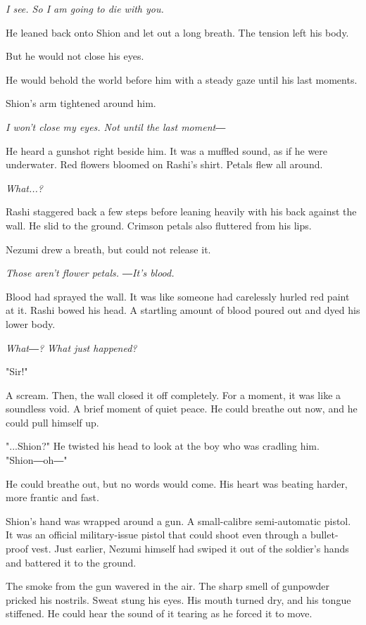 \emph{I see. So I am going to die with you.}

He leaned back onto Shion and let out a long breath. The tension left
his body.

But he would not close his eyes.

He would behold the world before him with a steady gaze until his last
moments.

Shion's arm tightened around him.

\emph{I won't close my eyes. Not until the last moment―}

He heard a gunshot right beside him. It was a muffled sound, as if he
were underwater. Red flowers bloomed on Rashi's shirt. Petals flew all
around.

\emph{What...?}

Rashi staggered back a few steps before leaning heavily with his back
against the wall. He slid to the ground. Crimson petals also fluttered
from his lips.

Nezumi drew a breath, but could not release it.

\emph{Those aren't flower petals. ―It's blood.}

Blood had sprayed the wall. It was like someone had carelessly hurled
red paint at it. Rashi bowed his head. A startling amount of blood
poured out and dyed his lower body.

\emph{What―? What just happened?}

"Sir!"

A scream. Then, the wall closed it off completely. For a moment, it was
like a soundless void. A brief moment of quiet peace. He could breathe
out now, and he could pull himself up.

"...Shion?" He twisted his head to look at the boy who was cradling him.
"Shion―oh―"

He could breathe out, but no words would come. His heart was beating
harder, more frantic and fast.

Shion's hand was wrapped around a gun. A small-calibre semi-automatic
pistol. It was an official military-issue pistol that could shoot even
through a bullet-proof vest. Just earlier, Nezumi himself had swiped it
out of the soldier's hands and battered it to the ground.

The smoke from the gun wavered in the air. The sharp smell of gunpowder
pricked his nostrils. Sweat stung his eyes. His mouth turned dry, and
his tongue stiffened. He could hear the sound of it tearing as he forced
it to move.

